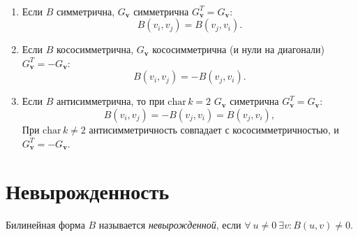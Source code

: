 \begin{stmt}
    ~\begin{enumerate}
        \item Если $B$ симметрична, $G_{\mathbf{v}}$ симметрична $G_{\mathbf{v}}^T = G_{\mathbf{v}}$: \[ B(v_i, v_j) = B(v_j, v_i). \]
        \item Если $B$ кососимметрична, $G_{\mathbf{v}}$ кососимметрична (и нули на диагонали)
            $G_{\mathbf{v}}^T = -G_{\mathbf{v}}$: \[ B(v_i, v_j) = -B(v_j, v_i). \]
        \item Если $B$ антисимметрична, то при $\mathrm{char}\, k = 2$ $G_{\mathbf{v}}$ симетрична 
            $G_{\mathbf{v}}^T = G_{\mathbf{v}}$: \[ B(v_i, v_j) = -B(v_j, v_i) = B(v_j, v_i), \]
            При $\mathrm{char}\, k \neq 2$ антисимметричность совпадает с кососимметричностью,
            и $G_{\mathbf{v}}^T = -G_{\mathbf{v}}$.

    \end{enumerate}
\end{stmt}



\section{Невырожденность}

\begin{definition}
    Билинейная форма $B$ называется \emph{невырожденной}, если $\forall\ u \neq 0\ \exists v\colon B(u,v) \neq 0$.
\end{definition}


